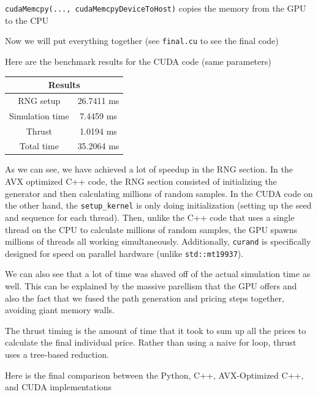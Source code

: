 \documentclass{article}
\begin{document}
\texttt{cudaMemcpy(..., cudaMemcpyDeviceToHost)} copies the memory from the GPU to the CPU

Now we will put everything together (see \texttt{final.cu} to see the final code)

Here are the benchmark results for the CUDA code (same parameters)
\begin{center}
    \begin{tabular}{|c|c|}
        \hline
        \multicolumn{2}{|c|}{Results} \\
        \hline
        RNG setup & 26.7411 ms \\
        \hline
        Simulation time & 7.4459 ms\\
        \hline
        Thrust & 1.0194 ms \\
        \hline
        Total time & 35.2064 ms \\
        \hline
    \end{tabular}
\end{center}

As we can see, we have achieved a lot of speedup in the RNG section.
In the AVX optimized C++ code, the RNG section consisted of initializing the generator and then calculating millions of random samples.
In the CUDA code on the other hand, the \texttt{setup\_kernel} is only doing initialization (setting up the seed and sequence for each thread).
Then, unlike the C++ code that uses a single thread on the CPU to calculate millions of random samples, the GPU spawns millions of threads all working simultaneously.
Additionally, \texttt{curand} is specifically designed for speed on parallel hardware (unlike \texttt{std::mt19937}).

We can also see that a lot of time was shaved off of the actual simulation time as well.
This can be explained by the massive parellism that the GPU offers and also the fact that we fused the path generation and pricing steps together, avoiding giant memory walls.

The thrust timing is the amount of time that it took to sum up all the prices to calculate the final individual price.
Rather than using a naive for loop, thrust uses a tree-based reduction.

Here is the final comparison between the Python, C++, AVX-Optimized C++, and CUDA implementations

\begin{figure}[h]
\centering
{}
\end{figure}
\end{document}
